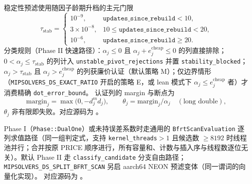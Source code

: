 稳定性预滤使用随因子龄期升档的主元门限
\begin{equation}
  \tau_{\text{stab}} =
  \begin{cases}
    10^{-9}, & \texttt{updates\_since\_rebuild} < 10,\\
    3\times 10^{-8}, & 10 \le \texttt{updates\_since\_rebuild} < 20,\\
    10^{-6}, & \texttt{updates\_since\_rebuild} \ge 20.
  \end{cases}
  \label{eq:lpkernel:stable-tol}
\end{equation}
分类规则（Phase II 快速路径）：$\alpha_j \le 0$ 且
$\alpha_j + e^{\text{cheap}}_j \le 0$ 的列直接排除；$0 < \alpha_j \le
\tau_{\text{stab}}$ 的列计入 \texttt{unstable\_pivot\_rejections} 并置
\texttt{stability\_blocked}；$\alpha_j > \tau_{\text{stab}}$ 且
$\alpha_j > e^{\text{cheap}}_j$ 的列获廉价认证（默认策略 M）；仅边界情形
（\texttt{MIPSOLVERS\_DS\_EXACT\_RATIO} 开启的策略 E，或 lean 模式下
$\alpha_j \le e^{\text{cheap}}_j$ 者）才消费精确 \texttt{dot\_error\_bound}。
认证列的 margin 与断点为
\begin{equation}
  \mathrm{margin}_j = \max\bigl(0, -d^{m}_j d_j\bigr),\qquad
  \theta_j = \mathrm{margin}_j / \alpha_j
  \quad(\text{long double}),
  \label{eq:lpkernel:breakpoint}
\end{equation}
$\theta_j$ 非有限即失败。对应源码为
。

\begin{boundarynote}
Phase I（\texttt{Phase::DualOne}）或未持误差系数时走通用的
\texttt{BfrtScanEvaluation} 逐列求值路径（同一组判定式，支持
\texttt{kernel\_threads}$>1$ 且候选数 $\ge 8192$ 时线程池并行；合并按原 PRICE
顺序进行，所有容量和、计数与插入序与线程数逐位无关）。默认 Phase II 走
\texttt{classify\_candidate} 分支自由路径；\texttt{MIPSOLVERS\_DS\_SPLIT\_BFRT\_SCAN}
另启 aarch64 NEON 预滤变体（同一谓词的向量化实现）。
对应源码为 。
\end{boundarynote}

